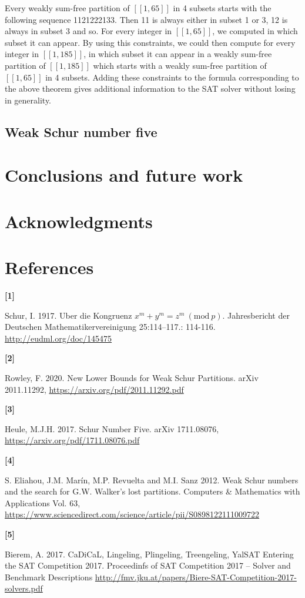 \documentclass{article}
\newtheorem{computational theorem}{Computational Theorem}[section]
\begin{document}
\par
Every weakly sum-free partition of \([\![1,65]\!]\) in 4 subsets starts with the following sequence 1121222133. Then 11 is always 
either in subset 1 or 3, 12 is always in subset 3 and so. For every integer in \([\![1,65]\!]\), we computed in which subset it can appear. 
By using this constraints, we could then compute for every integer in \([\![1,185]\!]\), in which subset it can appear in a weakly sum-free 
partition of  \([\![1,185]\!]\) which starts with a  weakly sum-free partition of \([\![1,65]\!]\) in 4 subsets. Adding these constraints to the 
formula corresponding to the above theorem gives additional information to the SAT solver without losing in generality. 


\subsection{Weak Schur number five}



\section{Conclusions and future work}



\section{Acknowledgments}



\section{References}

\hypertarget{label1}{\textbf{[1]}} Schur, I. 1917. Uber die Kongruenz \(x^m + y^m = z^m~(\text{mod}~p)\). Jahresbericht der 
Deutschen Mathematikervereinigung 25:114–117.: 114-116. \url{http://eudml.org/doc/145475}

\hypertarget{label2}{\textbf{[2]}} Rowley, F. 2020. New Lower Bounds for Weak Schur Partitions. arXiv 2011.11292, 
\url{https://arxiv.org/pdf/2011.11292.pdf}

\hypertarget{label3}{\textbf{[3]}} Heule, M.J.H. 2017. Schur Number Five. arXiv 1711.08076, \url{https://arxiv.org/pdf/1711.08076.pdf}

\hypertarget{label4}{\textbf{[4]}} S. Eliahou, J.M. Marín, M.P. Revuelta and M.I. Sanz 2012. Weak Schur numbers and the search for G.W. 
Walker’s lost partitions. Computers \& Mathematics with Applications Vol. 63, \url{https://www.sciencedirect.com/science/article/pii/S0898122111009722}

\hypertarget{label5}{\textbf{[5]}} Bierem, A. 2017. CaDiCaL, Lingeling, Plingeling, Treengeling, YalSAT Entering the SAT Competition 2017. 
Proceedinfs of SAT Competition 2017 -- Solver and Benchmark Descriptions \url{http://fmv.jku.at/papers/Biere-SAT-Competition-2017-solvers.pdf}
\end{document}
